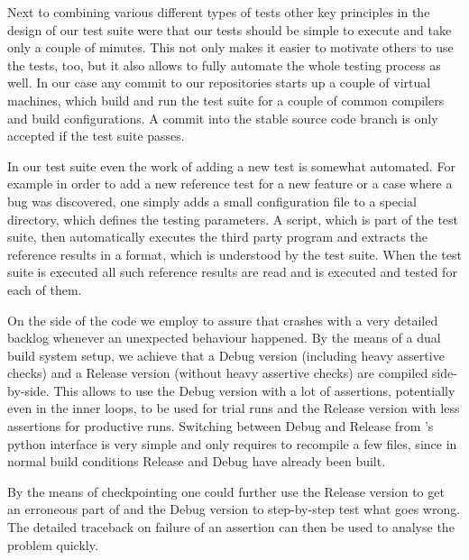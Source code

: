 Next to combining various different types of tests
other key principles in the design of our test suite were that our tests should be simple
to execute and take only a couple of minutes.
This not only makes it easier to motivate others to use the tests, too,
but it also allows to fully automate the whole testing process as well.
In our case any commit to our repositories starts up a couple of virtual machines,
which build \molsturm and run the test suite for a couple of common compilers and
build configurations.
A commit into the stable source code branch is only accepted if the test suite passes.

In our test suite even the work of adding a new test is somewhat automated.
For example in order to add a new reference test for a new feature
or a case where a bug was discovered,
one simply adds a small configuration file to a special directory,
which defines the testing parameters.
A \python script, which is part of the test suite,
then automatically executes the third party program and extracts the reference results in a format,
which is understood by the \molsturm test suite.
When the test suite is executed all such reference results are read and
\molsturm is executed and tested for each of them.


On the side of the \molsturm code we employ  to assure that
\molsturm crashes with a very detailed backlog whenever an unexpected behaviour happened.
By the means of a dual build system setup, we achieve that a Debug version
(including heavy assertive checks) and a Release version
(without heavy assertive checks) are compiled side-by-side.
This allows to use the Debug version with a lot of assertions,
potentially even in the inner loops,
to be used for trial runs and the Release version with less assertions for productive runs.
Switching between Debug and Release from \molsturm's python interface is very simple and
only requires to recompile a few files,
since in normal build conditions Release and Debug have already been built.

By the means of checkpointing one could further use the Release version to get an erroneous
part of \molsturm and the Debug version to step-by-step test what goes wrong.
The detailed traceback on failure of an assertion can then be used to analyse the problem quickly.






